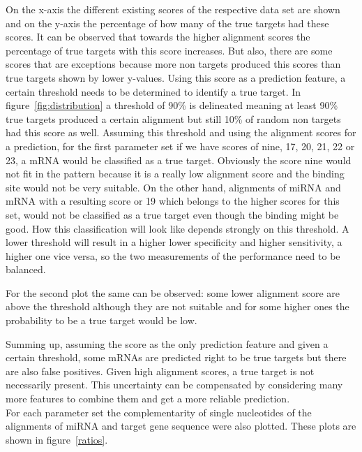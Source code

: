 \documentclass[12pt]{article}
\begin{document}
On the x-axis the different existing scores of the respective data set are shown and on the y-axis the percentage of how many of the true targets had these scores. It can be observed that towards the higher alignment scores the percentage of true targets with this score increases. But also, there are some scores that are exceptions because more non targets produced this scores than true targets shown by lower y-values. Using this score as a prediction feature, a certain threshold needs to be determined to identify a true target. In figure~\ref{fig:distribution} a threshold of 90\% is delineated meaning at least 90\% true targets produced a certain alignment but still 10\% of random non targets had this score as well. Assuming this threshold and using the alignment scores for a prediction, for the first parameter set if we have scores of nine, 17, 20, 21, 22 or 23, a mRNA would be classified as a true target. Obviously the score nine would not fit in the pattern because it is a really low alignment score and the binding site would not be very suitable. On the other hand, alignments of miRNA and mRNA with a resulting score or 19 which belongs to the higher scores for this set, would not be classified as a true target even though the binding might be good. How this classification will look like depends strongly on this threshold. A lower threshold will result in a higher lower specificity and higher sensitivity, a higher one vice versa, so the two measurements of the performance need to be balanced.

For the second plot the same can be observed: some lower alignment score are above the threshold although they are not suitable and for some higher ones the probability to be a true target would be low.

Summing up, assuming the score as the only prediction feature and given a certain threshold, some mRNAs are predicted right to be true targets but there are also false positives. Given high alignment scores, a true target is not necessarily present. This uncertainty can be compensated by considering many more features to combine them and get a more reliable prediction.\\


For each parameter set the complementarity of single nucleotides of the alignments of miRNA and target gene sequence were also plotted. These plots are shown in figure~\ref{ratios}.
\end{document}
